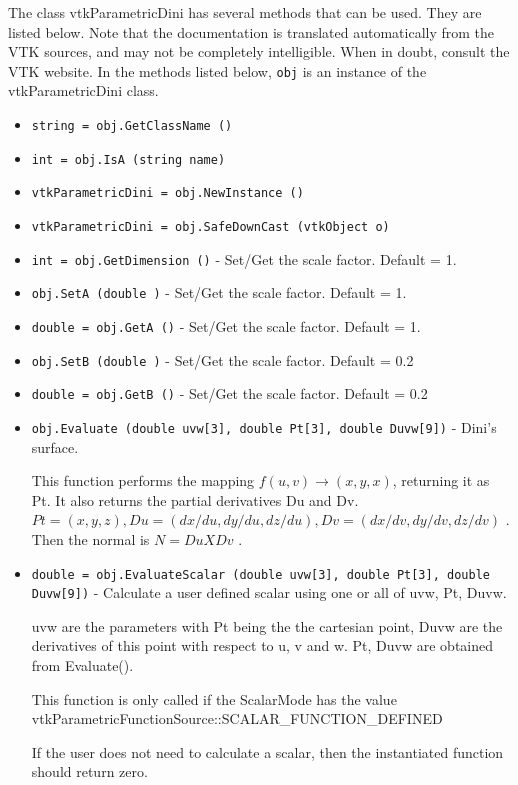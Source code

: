 The class vtkParametricDini has several methods that can be used.
  They are listed below.
Note that the documentation is translated automatically from the VTK sources,
and may not be completely intelligible.  When in doubt, consult the VTK website.
In the methods listed below, \verb|obj| is an instance of the vtkParametricDini class.
\begin{itemize}
\item  \verb|string = obj.GetClassName ()|

\item  \verb|int = obj.IsA (string name)|

\item  \verb|vtkParametricDini = obj.NewInstance ()|

\item  \verb|vtkParametricDini = obj.SafeDownCast (vtkObject o)|

\item  \verb|int = obj.GetDimension ()| -  Set/Get the scale factor. 
 Default = 1.

\item  \verb|obj.SetA (double )| -  Set/Get the scale factor. 
 Default = 1.

\item  \verb|double = obj.GetA ()| -  Set/Get the scale factor. 
 Default = 1.

\item  \verb|obj.SetB (double )| -  Set/Get the scale factor. 
 Default = 0.2

\item  \verb|double = obj.GetB ()| -  Set/Get the scale factor. 
 Default = 0.2

\item  \verb|obj.Evaluate (double uvw[3], double Pt[3], double Duvw[9])| -  Dini's surface.

 This function performs the mapping $f(u,v) \rightarrow (x,y,x)$, returning it
 as Pt. It also returns the partial derivatives Du and Dv.
 $Pt = (x, y, z), Du = (dx/du, dy/du, dz/du), Dv = (dx/dv, dy/dv, dz/dv)$ .
 Then the normal is $N = Du X Dv$ .

\item  \verb|double = obj.EvaluateScalar (double uvw[3], double Pt[3], double Duvw[9])| -  Calculate a user defined scalar using one or all of uvw, Pt, Duvw.

 uvw are the parameters with Pt being the the cartesian point, 
 Duvw are the derivatives of this point with respect to u, v and w.
 Pt, Duvw are obtained from Evaluate().

 This function is only called if the ScalarMode has the value
 vtkParametricFunctionSource::SCALAR\_FUNCTION\_DEFINED

 If the user does not need to calculate a scalar, then the 
 instantiated function should return zero. 


\end{itemize}

